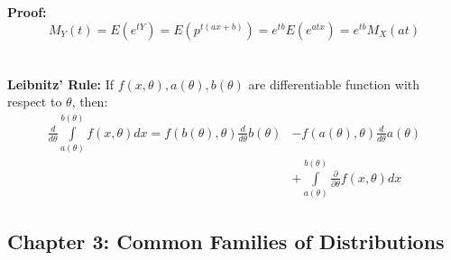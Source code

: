 \documentclass{article}
\begin{document}
\textbf{Proof:}
\begin{equation*}
M_Y(t) = E(e^{tY}) = E(p^{t(ax+b)}) = e^{tb}E(e^{atx}) = e^{tb}M_X(at)    
\end{equation*}
\\~\\
\noindent \textbf{Leibnitz' Rule:} If $f(x,\theta), a(\theta), b(\theta)$ are differentiable function with respect to $\theta$, then:
\begin{equation*}
\begin{split}
    \frac{d}{d\theta} \int\limits_{a(\theta)}^{b(\theta)} f(x,\theta) dx = f(b(\theta),\theta) \frac{d}{d\theta} b(\theta) &- f(a(\theta),\theta) \frac{d}{d\theta} a(\theta)\\ 
    &+ \int\limits_{a(\theta)}^{b(\theta)}\frac{\partial}{\partial \theta} f(x,\theta)dx
\end{split}
\end{equation*}

\subsection{Chapter 3: Common Families of Distributions}
\end{document}
